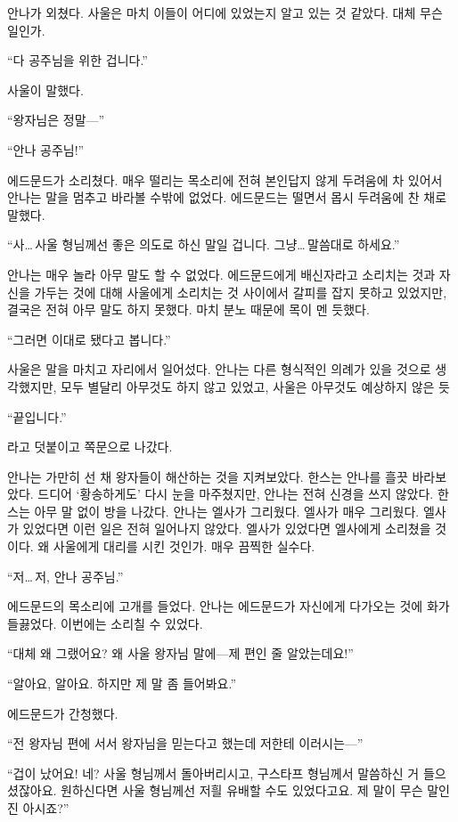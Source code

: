 안나가 외쳤다. 사울은 마치 이들이 어디에 있었는지 알고 있는 것 같았다. 대체 무슨 일인가.

``다 공주님을 위한 겁니다.''

사울이 말했다.

``왕자님은 정말—''

``안나 공주님!''

에드문드가 소리쳤다. 매우 떨리는 목소리에 전혀 본인답지 않게 두려움에 차 있어서 안나는 말을 멈추고 바라볼 수밖에 없었다. 에드문드는 떨면서 몹시 두려움에 찬 채로 말했다.

``사\ldots\,사울 형님께선 좋은 의도로 하신 말일 겁니다. 그냥\ldots\,말씀대로 하세요.''

안나는 매우 놀라 아무 말도 할 수 없었다. 에드문드에게 배신자라고 소리치는 것과 자신을 가두는 것에 대해 사울에게 소리치는 것 사이에서 갈피를 잡지 못하고 있었지만, 결국은 전혀 아무 말도 하지 못했다. 마치 분노 때문에 목이 멘 듯했다.

``그러면 이대로 됐다고 봅니다.''

사울은 말을 마치고 자리에서 일어섰다. 안나는 다른 형식적인 의례가 있을 것으로 생각했지만, 모두 별달리 아무것도 하지 않고 있었고, 사울은 아무것도 예상하지 않은 듯

``끝입니다.''

라고 덧붙이고 쪽문으로 나갔다.

안나는 가만히 선 채 왕자들이 해산하는 것을 지켜보았다. 한스는 안나를 흘끗 바라보았다. 드디어 `황송하게도' 다시 눈을 마주쳤지만, 안나는 전혀 신경을 쓰지 않았다. 한스는 아무 말 없이 방을 나갔다. 안나는 엘사가 그리웠다. 엘사가 매우 그리웠다. 엘사가 있었다면 이런 일은 전혀 일어나지 않았다. 엘사가 있었다면 엘사에게 소리쳤을 것이다. 왜 사울에게 대리를 시킨 것인가. 매우 끔찍한 실수다.

``저\ldots\,저, 안나 공주님.''

에드문드의 목소리에 고개를 들었다. 안나는 에드문드가 자신에게 다가오는 것에 화가 들끓었다. 이번에는 소리칠 수 있었다.

``대체 왜 그랬어요? 왜 사울 왕자님 말에—제 편인 줄 알았는데요!''

``알아요, 알아요. 하지만 제 말 좀 들어봐요.''

에드문드가 간청했다.

``전 왕자님 편에 서서 왕자님을 믿는다고 했는데 저한테 이러시는—''

``겁이 났어요! 네? 사울 형님께서 돌아버리시고, 구스타프 형님께서 말씀하신 거 들으셨잖아요. 원하신다면 사울 형님께선 저흴 유배할 수도 있었다고요. 제 말이 무슨 말인진 아시죠?''

